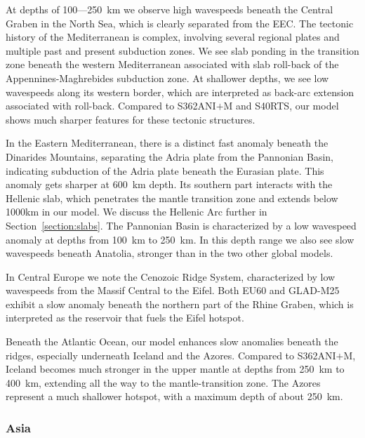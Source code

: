 \documentclass[extra,mreferee]{gji}
\begin{document}
At depths of 100---250~km we observe high wavespeeds beneath the Central Graben
in the North Sea, which is clearly separated from the EEC.
The tectonic history of the Mediterranean is complex,
involving several regional plates and multiple past and present subduction zones.
We see slab ponding in the transition zone beneath the western Mediterranean
associated with slab roll-back of the Appennines-Maghrebides subduction zone.
At shallower depths, we see low wavespeeds along its western border,
which are interpreted as back-arc extension associated with  roll-back.
Compared to S362ANI$+$M and S40RTS,
our model shows much sharper features for these tectonic structures.

In the Eastern Mediterranean, there is a distinct fast anomaly beneath the 
Dinarides Mountains, separating the Adria plate from the Pannonian Basin,
indicating subduction of the Adria plate beneath the Eurasian plate.
This anomaly gets sharper at 600~km depth.
Its southern part interacts with the Hellenic slab, which penetrates the mantle
transition zone and extends below 1000km in our model.
We discuss the Hellenic Arc further in Section~\ref{section:slabs}.
The Pannonian Basin is characterized by a low wavespeed
anomaly at depths from 100~km to 250~km.
In this depth range we also see slow wavespeeds beneath Anatolia,
stronger than in the two other global models.

In Central Europe we note the Cenozoic Ridge System, characterized by low 
wavespeeds from the Massif Central to the Eifel. Both EU60 and
GLAD-M25 exhibit a slow anomaly beneath the northern part of the Rhine Graben,
which is interpreted as the reservoir that fuels the Eifel hotspot.

Beneath the Atlantic Ocean, our model enhances slow anomalies beneath the
ridges, especially underneath Iceland and the Azores.
Compared to S362ANI$+$M, Iceland becomes much stronger in the upper mantle at
depths from 250~km to 400~km, extending all the way to the mantle-transition zone.
The Azores represent a much shallower hotspot, with a maximum depth of about 250~km.

\subsubsection{Asia}
\end{document}
